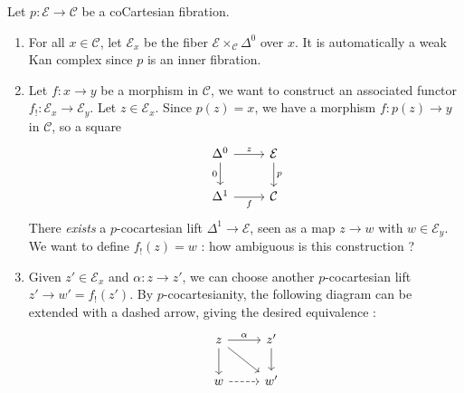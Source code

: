 \documentclass[11pt]{article}
\theoremstyle{definition}
\newcommand{\C}{\mathcal{C}}
\newcommand{\E}{\mathcal{E}}
\begin{document}
Let $p : \E \to \C$ be a coCartesian fibration.
\begin{enumerate}
    \item For all $x \in \C$, let $\E_x$ be the fiber $\E \times_{\C} \Delta^0$ over $x$.
    It is automatically a weak Kan complex since $p$ is an inner fibration.
    \item Let $f : x \to y$ be a morphism in $\C$, we want to construct an associated functor $f_! : \E_x \to \E_y$.
    Let $z \in \E_x$.
    Since $p(z) = x$, we have a morphism $f : p(z) \to y$ in $\C$, so a square
    \[\begin{tikzcd}
        {\Delta^0} & \E \\
        {\Delta^1} & \C
        \arrow["z", from=1-1, to=1-2]
        \arrow["0"', from=1-1, to=2-1]
        \arrow["p", from=1-2, to=2-2]
        \arrow["f"', from=2-1, to=2-2]
    \end{tikzcd}\]
    There \emph{exists} a $p$-cocartesian lift $\Delta^1 \to \E$, seen as a map $z \to w$ with $w \in \E_y$.
    We want to define $f_!(z) = w$ : how ambiguous is this construction ?
    \item Given $z' \in \E_x$ and $\alpha : z \to z'$, we can choose another $p$-cocartesian lift $z' \to w' = f_!(z')$.
    By $p$-cocartesianity, the following diagram can be extended with a dashed arrow, giving the desired equivalence :
    \[\begin{tikzcd}
        z & {z'} \\
        w & {w'}
        \arrow["\alpha", from=1-1, to=1-2]
        \arrow[from=1-1, to=2-1]
        \arrow[from=1-1, to=2-2]
        \arrow[from=1-2, to=2-2]
        \arrow[dashed, from=2-1, to=2-2]
    \end{tikzcd}\]
\end{enumerate}
\end{document}
